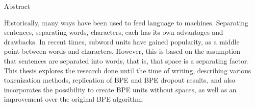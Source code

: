 %
%

\begin{center}
    \huge
    Abstract
    \vspace{1cm}
\end{center}

Historically, many ways have been used to feed language to machines. Separating sentences, separating words, characters, each has its own advantages and drawbacks. In recent times, subword units have gained popularity, as a middle point between words and characters. However, this is based on the assumption that sentences are separated into words, that is, that space is a separating factor. This thesis explores the research done until the time of writing, describing various tokenization methods, replication of BPE and BPE dropout results, and also incorporates the possibility to create BPE units without spaces, as well as an improvement over the original BPE algorithm.


